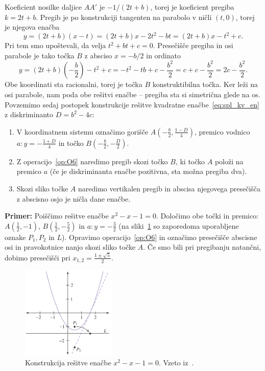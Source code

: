 Koeficient nosilke daljice $AA'$ je $ - 1/(2t + b)$, torej je koeficient pregiba $k = 2t + b$. Pregib je po konstrukciji tangenten na parabolo v ničli $(t, 0)$, torej je njegova enačba
$$ y = (2t + b)(x - t) = (2t + b)x - 2t^2 - bt = (2t + b)x - t^2 + c. $$
Pri tem smo upoštevali, da velja $t^2 + bt + c = 0$. Presečišče pregiba in osi parabole je tako točka $B$ z absciso $ x = -b/2 $ in ordinato
$$ y = (2t + b)\left(-\frac{b}{2}\right) - t^2 + c = - t^2 - tb + c - \frac{b^2}{2} = c + c - \frac{b^2}{2} = 2c - \frac{b^2}{2}.$$
Obe koordinati sta racionalni, torej je točka $B$ konstruktibilna točka. Ker leži na osi parabole, nam poda obe rešitvi enačbe -- pregiba sta si simetrična glede na os. Povzemimo sedaj postopek konstrukcije rešitve kvadratne enačbe~\ref{eq:spl_kv_en} z diskriminanto $D = b^2 - 4c$:
\begin{enumerate}
    \item V koordinatnem sistemu označimo gorišče $A\left(-\frac{b}{2}, \frac{1-D}{4}\right)$, premico vodnico $a: y =- \frac{1+D}{4}$ in točko $B(-\frac{b}{2}, -\frac{D}{2})$.
    \item Z operacijo~\ref{op:O6} naredimo pregib skozi točko $B$, ki točko $A$ položi na premico $a$ (če je diskriminanta enačbe pozitivna, sta možna pregiba dva).
    \item Skozi sliko točke $A$ naredimo vertikalen pregib in abscisa njegovega presečišča z abscisno osjo je ničla dane enačbe.
\end{enumerate}

\textbf{Primer:} Poiščimo rešitve enačbe $x^2 - x - 1 = 0$. Določimo obe točki in premico: $A(\frac{1}{2}, -1)$, $B(\frac{1}{2}, -\frac{5}{2})$ in $a: y = -\frac{3}{2}$ (na sliki~\ref{fig:par_primer_hull} so zaporedoma uporabljene oznake $P_1, P_2$ in $L$). Opravimo operacijo~\ref{op:O6} in označimo presečišče abscisne osi in pravokotnice nanjo skozi sliko točke $A$. Če smo bili pri pregibanju natančni, dobimo presečišči pri $x_{1,2} = \frac{1 \pm \sqrt{5}}{2}$.

\begin{figure}[h]
    \centering
    \includegraphics[width=0.4\textwidth]{images/kvadratna_enacba/primer_hull.png}
    \caption[Primer reševanja kvadratne enačbe]{Konstrukcija rešitve enačbe $x^2 - x - 1 = 0$. Vzeto iz~\cite[str.\ 37]{hull2020}.}
    \label{fig:par_primer_hull}
\end{figure}

